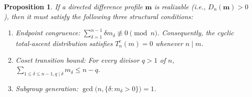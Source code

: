 \documentclass[11pt,a4paper]{amsart}
\newtheorem{proposition}[theorem]{Proposition}
\newcommand{\1}{\mathbf{1}}
\begin{document}
\begin{proposition}
\label{prop:realizability-obstructions}
If a directed difference profile $\bm{m}$ is realizable (i.e., $D_n(\bm{m}) > 0$), then it must satisfy the following three structural conditions:
\begin{enumerate}
    \item \emph{Endpoint congruence:} $\sum_{\delta=1}^{n-1} \delta m_\delta \not\equiv 0 \pmod n$. Consequently, the cyclic total-ascent distribution satisfies $T_n^c(m) = 0$ whenever $n \mid m$.
    \item \emph{Coset transition bound:} For every divisor $q > 1$ of $n$,  $\sum_{1 \le \delta \le n-1 , q \mid \delta} m_\delta \le n - q.$
    \item \emph{Subgroup generation:} $\gcd\bigl(n, \{\delta : m_\delta > 0\}\bigr) = 1$.
\end{enumerate}
\end{proposition}
\end{document}
